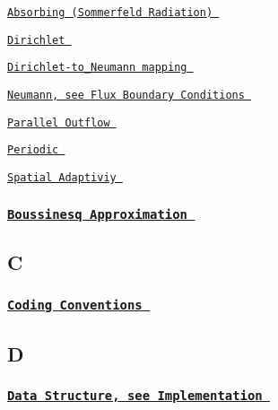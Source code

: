  
\begin{DoxyItemize}
\item  \href{ ../../helmholtz/scattering/html/index.html#ABCs }{\tt Absorbing (Sommerfeld Radiation) }  
\item  \href{ ../../poisson/two_d_poisson/html/index.html#constructor }{\tt Dirichlet }  
\item  \href{ ../../helmholtz/scattering/html/index.html#DtN }{\tt Dirichlet-\/to\-\_\-\-Neumann mapping }  
\item  \href{ ../../index/html/index.html#F.FluxBoundaryConditions }{\tt Neumann, see Flux Boundary Conditions }  
\item  \href{ ../../navier_stokes/vmtk_fluid/html/index.html#parallel_flow }{\tt Parallel Outflow }  
\item  \href{ ../../navier_stokes/rayleigh_channel/html/index.html#periodic }{\tt Periodic }  
\begin{DoxyItemize}
\item  \href{ ../../linear_elasticity/refineable_periodic_load/html/index.html#constructor }{\tt Spatial Adaptiviy }  
\end{DoxyItemize}
\end{DoxyItemize} \subsubsection*{ \href{ ../../multi_physics/b_convection/html/index.html }{\tt Boussinesq Approximation } }

 \subsection*{ C }

 \subsubsection*{ \href{ ../../coding_conventions/html/index.html }{\tt Coding Conventions } }

 \subsection*{ D }

 \subsubsection*{ \href{ ../../index/html/index.html#I.Implementation }{\tt Data Structure, see Implementation } }

